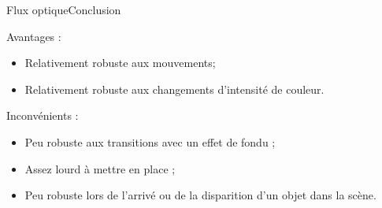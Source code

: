 \begin{frame}{Flux optique}{Conclusion}

\begin{block}{Avantages :}

\begin{itemize}
	\item Relativement robuste aux mouvements;
	\item Relativement robuste aux changements d'intensité de couleur.
\end{itemize}

\end{block}

\begin{block}{Inconvénients :}

\begin{itemize}
	\item Peu robuste aux transitions avec un effet de fondu ;
	\item Assez lourd à mettre en place ;
	\item Peu robuste lors de l'arrivé ou de la disparition d'un objet dans la scène.
\end{itemize}

\end{block}

\end{frame}
